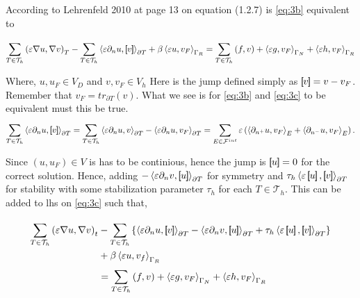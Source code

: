 According to Lehrenfeld 2010  \cite{lehrenfeld2010} at page 13 on equation (1.2.7)  is \eqref{eq:3b} equivalent to

\begin{equation}
\label{eq:3c}
\sum_{T \in \mathcal{T} _{h}}^{}   \left( \varepsilon \nabla u, \nabla v \right) _{T} -\sum_{T \in \mathcal{T} _{h}}^{}    \left<\varepsilon  \partial
_{n} u , \left[\!\!\left[  v  \right]\!\!\right] \right> _{\partial T}  + \beta  \left< \varepsilon u, v_{F}  \right>_{\Gamma _{R}} = \sum_{T
\in \mathcal{T} _{h}}^{} \left( f,v \right)  + \left<\varepsilon g, v_{F} \right>_{\Gamma _{N}} + \left<\varepsilon h,
v_{F} \right>_{\Gamma _{R}}
\end{equation}

Where, $u, u_{F} \in V_{D}$ and $v, v_{F} \in V_{h}$
Here is the jump defined simply as $\left[\!\!\left[ v \right]\!\!\right] = v - v_{F}$. Remember that $ v_{F} = tr_{\partial T} \left( v \right)  $. What we see is for \eqref{eq:3b} and \eqref{eq:3c} to be
equivalent must this be true.
\begin{equation}
\label{eq:3c4}
    \sum_{T \in \mathcal{T} _{h}}^{}  \left< \varepsilon \partial _{n} u, \left[\!\!\left[ v \right]\!\!\right]  \right>_{\partial T} = \sum_{T \in
    \mathcal{T} _{h}}^{}  \left< \varepsilon \partial _{n} u, v  \right>_{\partial T} - \left< \varepsilon
    \partial _{n} u, v_{F}  \right>_{\partial T} =\sum_{E \in
    \mathcal{F} ^{int}}^{}  \varepsilon \left( \left< \partial _{n^{+}} u, v_{F} \right>_{E}  + \left<\partial _{n^{-}}
u, v_{F}\right>_{E} \right)
.\end{equation}



Since $\left( u, u_{F} \right) \in V $ is has to be continious, hence the jump is $\left[\!\!\left[ u \right]\!\!\right] = 0$ for the correct
solution. Hence,
adding $-\left<\varepsilon \partial _{n} v, \left[\!\!\left[ u \right]\!\!\right] \right>_{\partial T}$ for symmetry and $ \tau _{h} \left<\varepsilon \jump{u},
\jump{v} \right>_{\partial T}$ for stability with some stabilization parameter $\tau _{h}$ for each $T \in
\mathcal{T}_{h} $. This can be added to lhs on \eqref{eq:3c} such that,

\begin{equation}
\label{eq:3c3}
\begin{split}
    \sum_{T \in \mathcal{T} _{h}}^{}   \left( \varepsilon \nabla u, \nabla v \right) _{t} &-\sum_{T \in \mathcal{T} _{h}}^{}
\left\{ \left<\varepsilon  \partial
_{n} u , \jump{ v } \right> _{\partial T}  -\left<\varepsilon
\partial _{n} v, \jump{u} \right>_{\partial T}  + \tau _{h} \left<\varepsilon \jump{u},
\jump{v} \right>_{\partial T} \right\}  \\ &+ \beta  \left< \varepsilon u, v_{f}  \right>_{\Gamma _{R}} \\
                                           &= \sum_{T
\in \mathcal{T} _{h}}^{} \left( f,v \right)  + \left<\varepsilon g, v_{F} \right>_{\Gamma _{N}} + \left<\varepsilon h,
v_{F} \right>_{\Gamma _{R}}
\end{split}
\end{equation}



